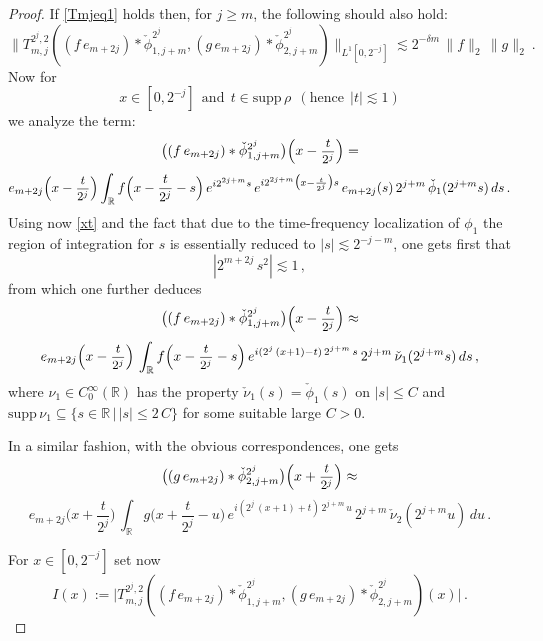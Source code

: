 \documentclass[a4paper,reqno]{amsart}
\numberwithin{equation}{section}
\theoremstyle{definition}
\newcommand{\R}{\mathbb{R}}
\newcommand{\sdfrac}[2]{\mbox{\small$\displaystyle\frac{#1}{#2}$}}
\def\d{\delta}
\begin{document}
\begin{proof}
If \eqref{Tmjeq1} holds then, for $j\geq m$, the following should also hold:
\begin{equation}\label{Tmjtrue}
\|T_{m,j}^{2^j,2}((f\,e_{m+2j})*\check{\phi}_{1,j+m}^{2^j},(g\,e_{m+2j})*\check{\phi}_{2,j+m}^{2^j})\|_{L^1[0,2^{-j}]}\lesssim 2^{-\d m}\,\|f\|_2\,\|g\|_2\:.
\end{equation}	
Now for
\begin{equation}\label{xt}
x\in [0,2^{-j}]\:\:\textrm{and}\:\:t\in \textrm{supp}\,\rho\:\:(\textrm{hence}\:\:|t|\lesssim 1)
\end{equation}
we analyze the term:	
$$\big((f\,e_{m+2j})*\check{\phi}_{1,j+m}^{2^j}\big)\Big(x-\sdfrac{t}{2^j}\Big)= $$
$$e_{m+2j}\Big(x-\sdfrac{t}{2^j}\Big)
\int_{\R} f\Big(x-\frac{t}{2^j}-s\Big)\,e^{i 2^{2j+m} s}\,e^{i 2^{2j+m} \big(x-\frac{t}{2^j}\big) s }\,e_{m+2j}(s)\,2^{j+m}\,
\check{\phi}_{1}(2^{j+m} s)\,ds\,.$$
Using now \eqref{xt} and the fact that due to the time-frequency localization of $\phi_1$ the region of integration for $s$ is essentially reduced to $|s|\lesssim 2^{-j-m}$, one gets first that
\begin{equation}\label{xts}
|2^{m+2j}\,s^2|\lesssim 1\,,
\end{equation}
from which one further deduces
\begin{equation}\label{appr}
	\big((f\,e_{m+2j})*\check{\phi}_{1,j+m}^{2^j}\big)\Big(x-\sdfrac{t}{2^j}\Big)\approx
\end{equation}
$$e_{m+2j}\Big(x-\sdfrac{t}{2^j}\Big)\,
\int_{\R} f\Big(x-\sdfrac{t}{2^j}-s\Big)\,e^{i (2^j\,(x+1)-t)\, 2^{j+m}\,s }\,2^{j+m}\,\check{\nu}_{1}(2^{j+m} s)\,ds\,,$$
where $\nu_1\in C_{0}^{\infty}(\R)$ has the property $\check{\nu}_1(s)=\check{\phi}_{1}(s)$ on $|s|\leq C$ and $\textrm{supp}\,\nu_1\subseteq \{s\in\R\,|\,|s|\leq  2\,C\}$ for some suitable large $C>0$.

In a similar fashion, with the obvious correspondences, one gets
\begin{equation}\label{appr0}
	\big((g\,e_{m+2j})*\check{\phi}_{2,j+m}^{2^j}\big)\Big(x+\sdfrac{t}{2^j}\Big)\approx
\end{equation}
$$ e_{m+2j}\Big(x+\frac{t}{2^j}\Big)\,
\int_{\R} g\Big(x+\frac{t}{2^j}-u\Big)\,e^{i (2^j\,(x+1)+t)\, 2^{j+m}\,u}\,2^{j+m}\,\check{\nu}_{2}(2^{j+m} u)\,du\,.$$

For $x\in [0,2^{-j}]$ set now
\begin{equation}\label{Idef}
I(x):=\Big|T_{m,j}^{2^j,2}((f\,e_{m+2j})*\check{\phi}_{1,j+m}^{2^j},(g\,e_{m+2j})*\check{\phi}_{2,j+m}^{2^j})(x)\Big|\,.
\end{equation}


\end{proof}
\end{document}

